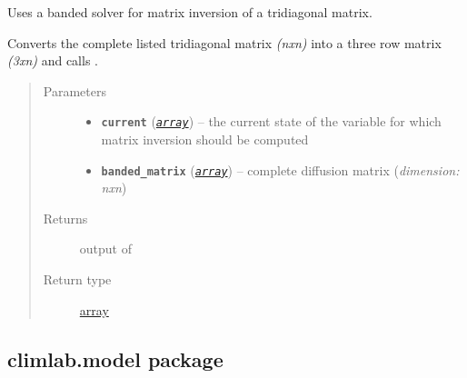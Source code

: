 \documentclass[a4paper,10pt,english]{sphinxmanual}
\begin{document}

\begin{fulllineitems}
\label{api/climlab.dynamics:climlab.dynamics.diffusion._solve_implicit_banded}
Uses a banded solver for matrix inversion of a tridiagonal matrix.

Converts the complete listed tridiagonal matrix \emph{(nxn)} into a three row 
matrix \emph{(3xn)} and calls \href{http://docs.scipy.org/doc/scipy/reference/generated/scipy.linalg.solve\_banded.html\#scipy.linalg.solve\_banded}{}.
\begin{quote}\begin{description}
\item[{Parameters}] \leavevmode\begin{itemize}
\item {} 
\textbf{\texttt{current}} (\href{http://docs.python.org/2.7/library/array.html\#module-array}{\emph{\texttt{array}}}) -- the current state of the variable for which
matrix inversion should be computed

\item {} 
\textbf{\texttt{banded\_matrix}} (\href{http://docs.python.org/2.7/library/array.html\#module-array}{\emph{\texttt{array}}}) -- complete diffusion matrix (\emph{dimension: nxn})

\end{itemize}

\item[{Returns}] \leavevmode
output of \href{http://docs.scipy.org/doc/scipy/reference/generated/scipy.linalg.solve\_banded.html\#scipy.linalg.solve\_banded}{}

\item[{Return type}] \leavevmode
\href{http://docs.python.org/2.7/library/array.html\#module-array}{array}

\end{description}\end{quote}

\end{fulllineitems}



\subsection{climlab.model package}
\label{api/climlab.model:climlab-model-package}\label{api/climlab.model::doc}
\end{document}
